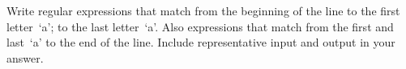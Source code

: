 Write regular expressions that match from the beginning of the line to
the first letter~`a'; to the last letter~`a'. Also expressions that
match from the first and last~`a' to the end of the line.
Include representative input and output in your answer.
